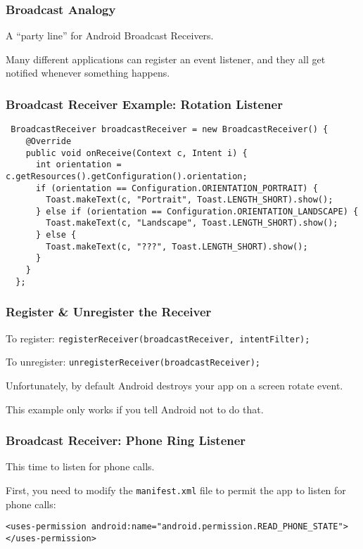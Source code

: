 \begin{frame}
\frametitle{Broadcast Analogy}
\begin{changemargin}{1cm}

A ``party line''
for Android Broadcast Receivers. 

Many different applications can
register an event listener, and they all get notified whenever
something happens.


\end{changemargin}
\end{frame}


\begin{frame}[fragile]
\frametitle{Broadcast Receiver Example: Rotation Listener}
\begin{changemargin}{0.5cm}
{\scriptsize
\begin{verbatim}
 BroadcastReceiver broadcastReceiver = new BroadcastReceiver() {
    @Override
    public void onReceive(Context c, Intent i) {
      int orientation = c.getResources().getConfiguration().orientation;
      if (orientation == Configuration.ORIENTATION_PORTRAIT) {
        Toast.makeText(c, "Portrait", Toast.LENGTH_SHORT).show();
      } else if (orientation == Configuration.ORIENTATION_LANDSCAPE) {
        Toast.makeText(c, "Landscape", Toast.LENGTH_SHORT).show();
      } else {
        Toast.makeText(c, "???", Toast.LENGTH_SHORT).show();
      }
    }
  };
\end{verbatim}

}
\end{changemargin}
\end{frame}

\begin{frame}
\frametitle{Register \& Unregister the Receiver}
\begin{changemargin}{1cm}
To register: {\scriptsize \texttt{registerReceiver(broadcastReceiver, intentFilter);}}

To unregister: {\scriptsize \texttt{unregisterReceiver(broadcastReceiver);}}

Unfortunately, by default Android destroys your app on a screen rotate event. 

This example only works if you tell Android not to do that.
\end{changemargin}
\end{frame}

\begin{frame}[fragile]
\frametitle{Broadcast Receiver: Phone Ring Listener}
\begin{changemargin}{1cm}

This time to listen for phone calls. 

First, you need to modify the {\tt manifest.xml} file to permit
the app to listen for phone calls:



{\scriptsize
\begin{verbatim}
<uses-permission android:name="android.permission.READ_PHONE_STATE">
</uses-permission>
\end{verbatim}
}
\end{changemargin}


\end{frame}


